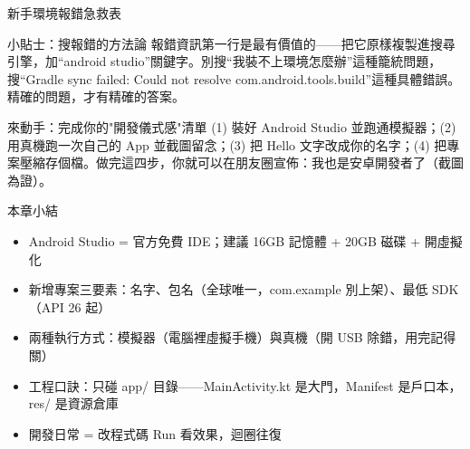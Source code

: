 \begin{center}\small\color{gray}新手環境報錯急救表\end{center}

\begin{tcbinfo}{小貼士：搜報錯的方法論}
報錯資訊第一行是最有價值的——把它原樣複製進搜尋引擎，加“android studio”關鍵字。別搜“我裝不上環境怎麼辦”這種籠統問題，搜“Gradle sync failed: Could not resolve com.android.tools.build”這種具體錯誤。精確的問題，才有精確的答案。

\end{tcbinfo}

\begin{tcbpractice}{來動手：完成你的"開發儀式感"清單}
(1) 裝好 Android Studio 並跑通模擬器；(2) 用真機跑一次自己的 App 並截圖留念；(3) 把 Hello 文字改成你的名字；(4) 把專案壓縮存個檔。做完這四步，你就可以在朋友圈宣佈：我也是安卓開發者了（截圖為證）。

\end{tcbpractice}

\begin{tcbsummary}{本章小結}
\begin{itemize}
  \item Android Studio = 官方免費 IDE；建議 16GB 記憶體 + 20GB 磁碟 + 開虛擬化
  \item 新增專案三要素：名字、包名（全球唯一，com.example 別上架）、最低 SDK（API 26 起）
  \item 兩種執行方式：模擬器（電腦裡虛擬手機）與真機（開 USB 除錯，用完記得關）
  \item 工程口訣：只碰 app/ 目錄——MainActivity.kt 是大門，Manifest 是戶口本，res/ 是資源倉庫
  \item 開發日常 = 改程式碼 Run 看效果，迴圈往復
\end{itemize}

\end{tcbsummary}
